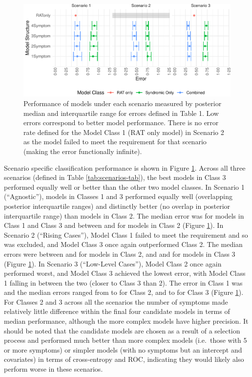 \documentclass[]{elsarticle} %
\begin{document}
\begin{figure}
\includegraphics[width=1\linewidth]{0501_MainText_files/figure-latex/scenario-plot-1} \caption{Performance of models under each scenario measured by posterior median and interquartile range for errors defined in Table 1. Low errors correspond to better model performance. There is no error rate defined for the Model Class 1 (RAT only model) in Scenario 2 as the model failed to meet the requirement for that scenario (making the error functionally infinite).}\label{fig:scenario-plot}
\end{figure}

Scenario specific classification performance is shown in Figure \ref{fig:scenario-plot}.
Across all three scenarios (defined in Table \ref{tab:scenarios-tab}), the best models in Class 3 performed equally well or better than the other two model classes.
In Scenario 1 (``Agnostic''), models in Classes 1 and 3 performed equally well (overlapping posterior interquartile ranges) and distinctly better (no overlap in posterior interquartile range) than models in Class 2.
The median error was  for models in Class 1 and Class 3 and between  and  for models in Class 2 (Figure \ref{fig:scenario-plot}).
In Scenario 2 (``Rising Cases''), Model Class 1 failed to meet the requirement and so was excluded, and Model Class 3 once again outperformed Class 2.
The median errors were between  and  for models in Class 2, and  and  for models in Class 3 (Figure \ref{fig:scenario-plot}).
In Scenario 3 (``Low-Level Cases''), Model Class 2 once again performed worst, and Model Class 3 achieved the lowest error, with Model Class 1 falling in between the two (closer to Class 3 than 2).
The error in Class 1 was  and the median errors ranged from  to  for Class 2, and  to  for Class 3 (Figure \ref{fig:scenario-plot}).
For Classes 2 and 3 across all the scenarios the number of symptoms made relatively little difference within the final four candidate models in terms of median performance, although the more complex models have higher precision.
It should be noted that the candidate models are chosen as a result of a selection process and performed much better than more complex models (i.e.~those with 5 or more symptoms) or simpler models (with no symptoms but an intercept and covariates) in terms of cross-entropy and ROC, indicating they would likely also perform worse in these scenarios.
\end{document}

